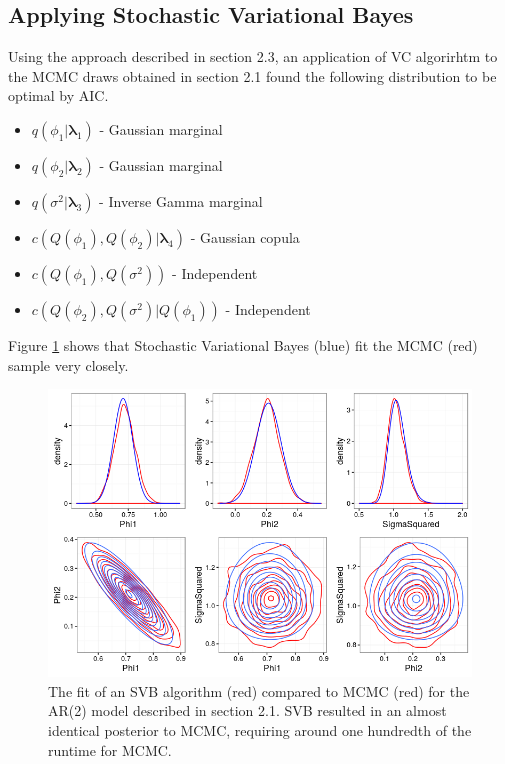 \documentclass[12pt,a4paper]{article}%
\numberwithin{equation}{section}
\begin{document}
\subsection{Applying Stochastic Variational Bayes}

Using the approach described in section 2.3, an application of VC algorirhtm to the MCMC draws obtained in section 2.1 found the following distribution to be optimal by AIC.

\begin{itemize}
\item $q(\phi_1 | \boldsymbol{\lambda}_1)$ - Gaussian marginal
\item $q(\phi_2| \boldsymbol{\lambda}_2)$ - Gaussian marginal
\item $q(\sigma^2| \boldsymbol{\lambda}_3)$ - Inverse Gamma marginal
\item $c(Q(\phi_1), Q(\phi_2) | \boldsymbol{\lambda}_4)$ - Gaussian copula
\item $c(Q(\phi_1), Q(\sigma^2))$ - Independent
\item $c(Q(\phi_2), Q(\sigma^2) | Q(\phi_1))$ - Independent
\end{itemize}

Figure \ref{VBfit} shows that Stochastic Variational Bayes (blue) fit the MCMC (red) sample very closely.

\begin{figure}[h]
\centering
\includegraphics[scale = 0.5]{VBfit.png}
\caption{The fit of an SVB algorithm (red) compared to MCMC (red) for the AR(2) model described in section 2.1. SVB resulted in an almost identical posterior to MCMC, requiring around one hundredth of the runtime for MCMC.}
\label{VBfit}
\end{figure}
\end{document}
